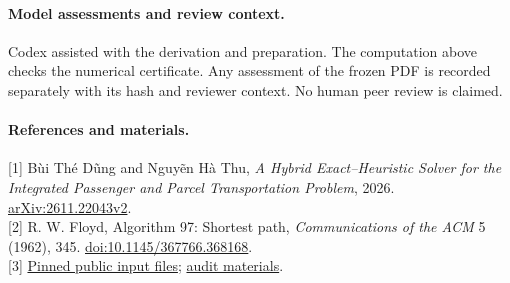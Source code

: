 \documentclass[11pt]{article}
\begin{document}
\paragraph{Model assessments and review context.}
Codex assisted with the derivation and preparation. The computation above checks the numerical certificate. Any assessment of the frozen PDF is recorded separately with its hash and reviewer context. No human peer review is claimed.

\small
\paragraph{References and materials.}
[1] B\`ui Th\'e D\~ung and Nguy\~en H\`a Thu, \emph{A Hybrid Exact--Heuristic Solver for the Integrated Passenger and Parcel Transportation Problem}, 2026. \href{https://arxiv.org/abs/2611.22043v2}{arXiv:2611.22043v2}.\\
{[2]} R. W. Floyd, Algorithm 97: Shortest path, \emph{Communications of the ACM} 5 (1962), 345. \href{https://doi.org/10.1145/367766.368168}{doi:10.1145/367766.368168}.\\
{[3]} \href{https://github.com/25023189-bit/Integrated-Passenger-and-Parcel-Transportation-SOICT-2026/tree/ecc264d51cae1fb5a3ef85b35b8b7a8c26b2cf47/data}{Pinned public input files}; \href{https://github.com/lluiseriksson/THE-ERIKSSON-PROGRAMME/tree/codex/plazos-publicos-20261120/audits/parcel-deadlines}{audit materials}.
\end{document}
